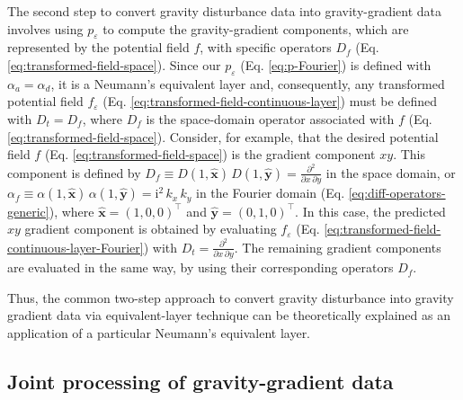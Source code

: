 The second step to convert gravity disturbance data into gravity-gradient data involves using 
$p_{\varepsilon}$ to compute the gravity-gradient components, which are represented by the 
potential field $f$, with specific operators $D_{f}$ (Eq. 
\ref{eq:transformed-field-space}). 
Since our $p_{\varepsilon}$ (Eq. \ref{eq:p-Fourier}) is defined with $\alpha_{a} = 
\alpha_{d}$, it is a Neumann's equivalent layer \citep{oliveirajr_etal2026_1} and, consequently, 
any transformed potential field $f_{\varepsilon}$ 
(Eq. \ref{eq:transformed-field-continuous-layer}) must be defined with $D_{t} = D_{f}$, 
where $D_{f}$ is the space-domain 
operator associated with $f$ (Eq. \ref{eq:transformed-field-space}).
Consider, for example, that the desired potential field $f$ (Eq. 
\ref{eq:transformed-field-space}) is the gradient 
component $xy$. This component is defined by  
$D_{f} \equiv D(1, \hat{\mathbf{x}}) \, D(1, \hat{\mathbf{y}}) = \tfrac{\partial^{2}}{\partial x \, \partial y}$ in the
space domain, or 
$\alpha_{f} \equiv \alpha(1, \hat{\mathbf{x}}) \, \alpha(1, \hat{\mathbf{y}}) = \mathrm{i}^{2} \, k_{x} \, k_{y}$
in the Fourier domain (Eq. \ref{eq:diff-operators-generic}), where 
$\hat{\mathbf{x}} = (1, 0, 0)^{\top}$ and
$\hat{\mathbf{y}} = (0, 1, 0)^{\top}$.
In this case, the predicted $xy$ gradient component is obtained by evaluating 
$f_{\varepsilon}$ (Eq. \ref{eq:transformed-field-continuous-layer-Fourier}) with 
$D_{t} = \tfrac{\partial^{2}}{\partial x \, \partial y}$.
The remaining gradient components are evaluated in the same way, by using their corresponding 
operators $D_{f}$.

Thus, the common two-step approach to convert gravity disturbance into gravity
gradient data via equivalent-layer technique 
\citep[e.g.,][]{piauilino_etal2019_seg, oliveirajr_etal2023, piauilino_etal2025b} 
can be theoretically explained as an application of a particular Neumann's equivalent layer.

\subsection{Joint processing of gravity-gradient data}

